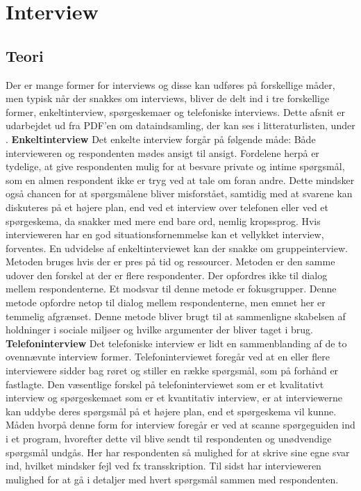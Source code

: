 \chapter{Interview}
\section{Teori}
Der er mange former for interviews og disse kan udføres på forskellige måder, men typisk når der snakkes om interviews, bliver de delt ind i tre forskellige former, enkeltinterview, spørgeskemaer og telefoniske interviews.
Dette afsnit er udarbejdet ud fra PDF'en om dataindsamling, der kan ses i litteraturlisten, under \citep{metodeogprojektskrivning}.
\textbf{Enkeltinterview}
Det enkelte interview forgår på følgende måde: Både intervieweren og respondenten mødes ansigt til ansigt. Fordelene herpå er tydelige, at give respondenten mulig for at besvare private og intime spørgsmål, som en almen respondent ikke er tryg ved at tale om foran andre. Dette mindsker også chancen for at spørgsmålene bliver misforstået, samtidig med at svarene kan diskuteres på et højere plan, end ved et interview over telefonen eller ved et spørgeskema, da snakker med mere end bare ord, nemlig kropssprog. Hvis intervieweren har en god situationsfornemmelse kan et vellykket interview, forventes. 
En udvidelse af enkeltinterviewet kan der snakke om gruppeinterview. Metoden bruges hvis der er pres på tid og ressourcer. Metoden er den samme udover den forskel at der er flere respondenter. Der opfordres ikke til dialog mellem respondenterne. Et modsvar til denne metode er fokusgrupper. Denne metode opfordre netop til dialog mellem respondenterne, men emnet her er temmelig afgrænset. Denne metode bliver brugt til at sammenligne skabelsen af holdninger i sociale miljøer og hvilke argumenter der bliver taget i brug. 
\textbf{Telefoninterview}
Det telefoniske interview er lidt en sammenblanding af de to ovennævnte interview former. Telefoninterviewet foregår ved at en eller flere interviewere sidder bag røret og stiller en række spørgsmål, som på forhånd er fastlagte. Den væsentlige forskel på telefoninterviewet som er et kvalitativt interview og spørgeskemaet som er et kvantitativ interview, er at interviewerne kan uddybe deres spørgsmål på et højere plan, end et spørgeskema vil kunne. Måden hvorpå denne form for interview foregår er ved at scanne spørgeguiden ind i et program, hvorefter dette vil blive sendt til respondenten og unødvendige spørgsmål undgås. Her har respondenten så mulighed for at skrive sine egne svar ind, hvilket mindsker fejl ved fx transskription. Til sidst har intervieweren mulighed for at gå i detaljer med hvert spørgsmål sammen med respondenten.

